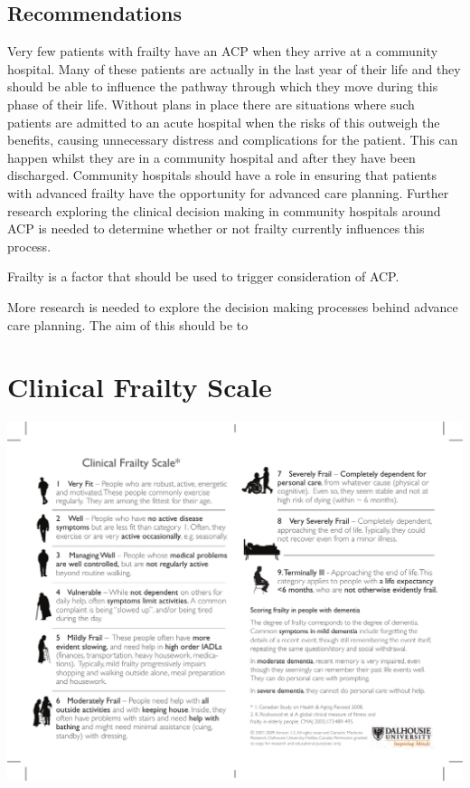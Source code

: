 \documentclass
[
	12pt,
	a4paper,
	oneside,
]{report}
\begin{document}
\section{Recommendations}
Very few patients with frailty have an ACP when they arrive at a community
hospital. Many of these patients are actually in the last year of their life
and they should be able to influence the pathway through which they move
during this phase of their life. Without plans in place there are situations
where such patients are admitted to an acute hospital when the risks of 
this outweigh the benefits, causing unnecessary distress and complications
for the patient. This can happen whilst they are in a community hospital
and after they have been discharged. Community hospitals should have a role 
in ensuring that patients with advanced frailty have the opportunity for
advanced care planning. 
Further research exploring the clinical decision making 
in community hospitals around ACP is needed to determine whether or not
frailty currently influences this process.

Frailty is a factor that should be used to trigger consideration of ACP.

More research is needed to explore the decision making processes behind
advance care planning. The aim of this should be to 

\printbibliography[heading=bibintoc]

\clearpage

\appendix
\chapter{Clinical Frailty Scale}
\label{apx:cfs}
\includegraphics[width=\textwidth]{CFS}
\end{document}
